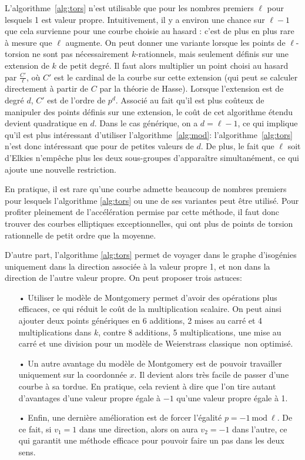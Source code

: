 \documentclass[11pt,a4paper]{article}
\renewcommand{\mod}{\ \mathrm{mod}\ }
\renewcommand{\v}{\vspace{5mm}}
\theoremstyle{definition}
\begin{document}
\v

L'algorithme~\ref{alg:tors} n'est utilisable que pour les nombres premiers $\ell$ pour lesquels 1 est valeur propre. Intuitivement, il y a environ une chance sur $\ell - 1$ que cela survienne pour une courbe choisie \og au hasard \fg : c'est de plus en plus rare à mesure que $\ell$ augmente. On peut donner une variante lorsque les points de $\ell$-torsion ne sont pas nécessairement $k$-rationnels, mais seulement définis sur une extension de $k$ de petit degré. Il faut alors multiplier un point choisi au hasard par $\frac{C'}{\ell}$, où $C'$ est le cardinal de la courbe sur cette extension (qui peut se calculer directement à partir de $C$ par la théorie de Hasse). Lorsque l'extension est de degré $d$, $C'$ est de l'ordre de $p^d$. Associé au fait qu'il est plus coûteux de manipuler des points définis sur une extension, le coût de cet algorithme étendu devient quadratique en $d$. Dans le cas générique, on a $d = \ell - 1$, ce qui implique qu'il est plus intéressant d'utiliser l'algorithme~\ref{alg:mod}: l'algorithme~\ref{alg:tors} n'est donc intéressant que pour de petites valeurs de $d$. De plus, le fait que $\ell$ soit d'Elkies n'empêche plus les deux sous-groupes d'apparaître simultanément, ce qui ajoute une nouvelle restriction.

En pratique, il est rare qu'une courbe admette beaucoup de nombres premiers pour lesquels l'algorithme \ref{alg:tors} ou une de ses variantes peut être utilisé. Pour profiter pleinement de l'accélération permise par cette méthode, il faut donc trouver des courbes elliptiques exceptionnelles, qui ont plus de points de torsion rationnelle de petit ordre que la moyenne.

\v
D'autre part, l'algorithme \ref{alg:tors} permet de voyager dans le graphe d'isogénies uniquement dans la direction associée à la valeur propre 1, et non dans la direction de l'autre valeur propre. On peut proposer trois astuces:
\begin{itemize}
\item[•] Utiliser le modèle de Montgomery permet d'avoir des opérations plus efficaces, ce qui réduit le coût de la multiplication scalaire. On peut ainsi ajouter deux points génériques en 6 additions, 2 mises au carré et 4 multiplications dans $k$, contre 8 additions, 5 multiplications, une mise au carré et une division pour un modèle de Weierstrass \og classique\fg\ non optimisé.

\item[•] Un autre avantage du modèle de Montgomery est de pouvoir travailler uniquement sur la coordonnée $x$. Il devient alors très facile de passer d'une courbe à sa tordue. En pratique, cela revient à dire que l'on tire autant d'avantages d'une valeur propre égale à $-1$ qu'une valeur propre égale à 1.

\item[•] Enfin, une dernière amélioration est de forcer l'égalité $p = -1 \mod\ell$. De ce fait, si $v_1 = 1$ dans une direction, alors on aura $v_2 = -1$ dans l'autre, ce qui garantit une méthode efficace pour pouvoir faire un pas dans les deux sens.
\end{itemize}
\v
\end{document}
